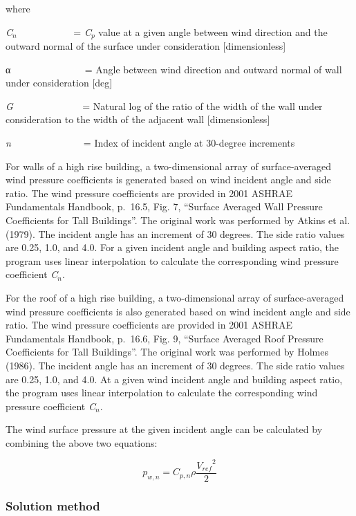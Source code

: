 where

\emph{C\(_{n}\)}~~~~~~~~~~~ = \emph{C\(_{p}\)} value at a given angle between wind direction and the outward normal of the surface under consideration {[}dimensionless{]}

α~~~ ~~~~~~~~~~~ = Angle between wind direction and outward normal of wall under consideration {[}deg{]}

\emph{G}~~ ~~~~~~~~~~~ = Natural log of the ratio of the width of the wall under consideration to the width of the adjacent wall {[}dimensionless{]}

\emph{n} ~~ ~~~~~~~~~~~ = Index of incident angle at 30-degree increments

For walls of a high rise building, a two-dimensional array of surface-averaged wind pressure coefficients is generated based on wind incident angle and side ratio. The wind pressure coefficients are provided in 2001 ASHRAE Fundamentals Handbook, p.~16.5, Fig. 7, ``Surface Averaged Wall Pressure Coefficients for Tall Buildings''. The original work was performed by Atkins et al. (1979). The incident angle has an increment of 30 degrees. The side ratio values are 0.25, 1.0, and 4.0. For a given incident angle and building aspect ratio, the program uses linear interpolation to calculate the corresponding wind pressure coefficient \emph{C\(_{n}\)}.

For the roof of a high rise building, a two-dimensional array of surface-averaged wind pressure coefficients is also generated based on wind incident angle and side ratio. The wind pressure coefficients are provided in 2001 ASHRAE Fundamentals Handbook, p.~16.6, Fig. 9, ``Surface Averaged Roof Pressure Coefficients for Tall Buildings''. The original work was performed by Holmes (1986). The incident angle has an increment of 30 degrees. The side ratio values are 0.25, 1.0, and 4.0. At a given wind incident angle and building aspect ratio, the program uses linear interpolation to calculate the corresponding wind pressure coefficient \emph{C\(_{n}\)}.

The wind surface pressure at the given incident angle can be calculated by combining the above two equations:

\begin{equation}
{p_{w,n}} = {C_{p,n}}\rho \frac{{{V_{ref}}^2}}{2}
\end{equation}

\subsubsection{Solution method}\label{solution-method}

